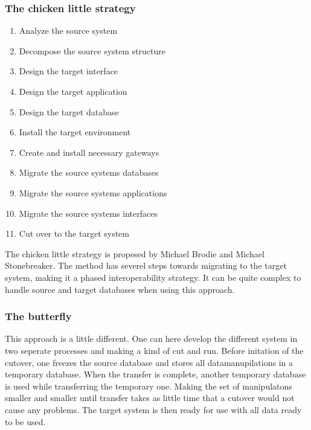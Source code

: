 \subsubsection{The chicken little strategy}
\begin{enumerate}
\item Analyze the source system
\item Decompose the source system structure
\item Design the target interface
\item Design the target application
\item Design the target database
\item Install the target environment
\item Create and install necessary gateways
\item Migrate the source systems databases
\item Migrate the source systems applications
\item Migrate the source systems interfaces
\item Cut over to the target system
\end{enumerate}
The chicken little strategy is propesed by Michael Brodie and Michael Stonebreaker.
The method has severel steps towards migrating to the target system, making it a phased interoperability strategy.
It can be quite complex to handle source and target databases when using this approach.
\subsubsection{The butterfly}
This approach is a little different. One can here develop the different system in two seperate processes and making a kind of cut and run.
Before initation of the cutover, one freezes the source database and stores all datamanupilations in a temporary database. 
When the transfer is complete, another temporary database is used while transferring the temporary one.
Making the set of manipulatons smaller and smaller until transfer takes as little time that a cutover would not cause any problems.
The target system is then ready for use with all data ready to be used. 
